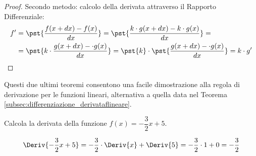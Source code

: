 \begin{proof}
Secondo metodo: calcolo della derivata attraverso il Rapporto Differenziale:
\begin{align*}
f' &= \pst{\frac{f(x +dx) - f(x)}{dx}} = 
      \pst{\frac{k \cdot g(x +dx) - k \cdot g(x)}{dx}} = \\
   &= \pst{k \cdot \frac{g(x +dx) - \cdot g(x)}{dx}} = 
      \pst{k} \cdot \pst{\frac{g(x +dx) - \cdot g(x)}{dx}} = 
      k \cdot g'
\end{align*}
\end{proof}

\begin{osservazione}
Questi due ultimi teoremi consentono una facile dimostrazione alla regola di 
derivazione per le funzioni lineari, alternativa a quella data nel Teorema 
\ref{subsec:differenziazione_derivataflineare}.
\end{osservazione}

\begin{esempio}
\label{esem:diff_prodottocostante}
Calcola la derivata della funzione \(f(x)=-\dfrac{3}{2}x+5\).

\[\Deriv{-\dfrac{3}{2}x+5} = 
  -\dfrac{3}{2} \cdot \Deriv{x} + \Deriv{5} = 
  -\dfrac{3}{2} \cdot 1 + 0 = -\dfrac{3}{2}\]
\end{esempio}

